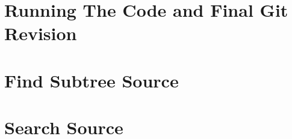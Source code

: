 \appendix
\label{sec:Appendix}
\section{Running The Code and Final Git Revision}

\section{Find Subtree Source}
\label{sec:findSubtree}

\section{Search Source}
\label{sec:SearchSource}
